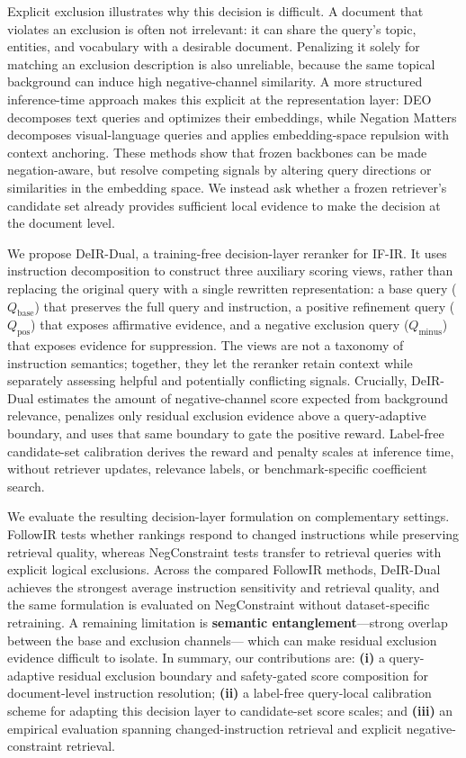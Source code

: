 \documentclass[letterpaper]{article}
\newcommand{\method}{DeIR-Dual}
\newcommand{\qbase}{Q_{\text{base}}}
\newcommand{\qpos}{Q_{\text{pos}}}
\newcommand{\qminus}{Q_{\text{minus}}}
\begin{document}
Explicit exclusion illustrates why this decision is difficult.  A
document that violates an exclusion is often not irrelevant: it can
share the query's topic, entities, and vocabulary with a desirable
document.  Penalizing it solely for matching an exclusion description is
also unreliable, because the same topical background can induce high
negative-channel similarity.  A more structured inference-time approach
makes this explicit at the representation layer: DEO \cite{deo2026} decomposes text queries
and optimizes their embeddings, while Negation Matters
\cite{pokhrel2026negation} decomposes visual-language queries and applies
embedding-space repulsion with context anchoring.  These methods show
that frozen backbones can be made negation-aware, but resolve competing
signals by altering query directions or similarities in the embedding
space.  We instead ask whether a frozen retriever's candidate set already
provides sufficient local evidence to make the decision at the document
level.

We propose \method{}, a training-free decision-layer reranker for IF-IR.  It
uses instruction decomposition to construct three auxiliary scoring views,
rather than replacing the original query with a single rewritten
representation: a base query ($\qbase$) that
preserves the full query and instruction, a positive refinement query
($\qpos$) that exposes affirmative evidence, and a negative exclusion
query ($\qminus$) that exposes evidence for suppression.  The views are
not a taxonomy of instruction semantics; together, they let the reranker
retain context while separately assessing helpful and potentially
conflicting signals.  Crucially, \method{} estimates the amount of
negative-channel score expected from background relevance, penalizes
only residual exclusion evidence above a query-adaptive boundary, and
uses that same boundary to gate the positive reward.  Label-free
candidate-set calibration derives the reward and penalty scales at
inference time, without retriever updates, relevance labels, or
benchmark-specific coefficient search.

We evaluate the resulting decision-layer formulation on complementary
settings.  FollowIR tests whether rankings respond to changed
instructions while preserving retrieval quality, whereas NegConstraint
\cite{xu2025logical} tests transfer to retrieval queries with explicit
logical exclusions.  Across the compared FollowIR methods, \method{}
achieves the strongest average instruction sensitivity and retrieval
quality, and the same formulation is evaluated on NegConstraint without
dataset-specific retraining.  A remaining limitation is \textbf{semantic
entanglement}---strong overlap between the base and exclusion channels---
which can make residual exclusion evidence difficult to isolate.  In
summary, our contributions are: \textbf{(i)} a
query-adaptive residual exclusion boundary and safety-gated score
composition for document-level instruction resolution; \textbf{(ii)} a
label-free query-local calibration scheme for adapting this decision
layer to candidate-set score scales; and \textbf{(iii)} an empirical
evaluation spanning changed-instruction retrieval and explicit
negative-constraint retrieval.
\end{document}
